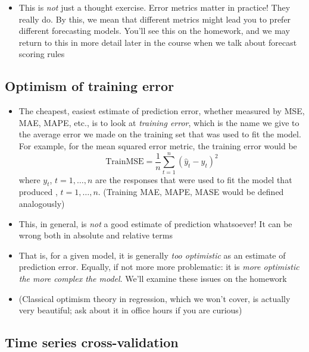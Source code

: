 \documentclass{article}
\begin{document}
\begin{itemize}
\item This is \emph{not} just a thought exercise. Error metrics matter in
  practice! They really do. By this, we mean that different metrics might lead
  you to prefer different forecasting models. You'll see this on the homework,
  and we may return to this in more detail later in the course when we talk
  about forecast scoring rules  
\end{itemize}

\subsection{Optimism of training error}

\def\TrainMSE{\mathrm{TrainMSE}}

\begin{itemize}
\item The cheapest, easiest estimate of prediction error, whether measured by
  MSE, MAE, MAPE, etc., is to look at \emph{training error}, which is the name
  we give to the average error we made on the training set that was used to fit
  the model. For example, for the mean squared error metric, the training error
  would be
  \[
  \TrainMSE = \frac{1}{n} \sum_{t=1}^n (\hat{y}_t - y_t)^2
  \]
  where $y_t$, $t = 1,\dots,n$ are the responses that were used to fit the model
  that produced , $t = 1,\dots,n$. (Training MAE, MAPE, MASE 
  would be defined analogously)

\item This, in general, is \emph{not} a good estimate of prediction
  whatsoever! It can be wrong both in absolute and relative terms

\item That is, for a given model, it is generally \emph{too optimistic} as an
  estimate of prediction error. Equally, if not more more problematic: it is
  \emph{more optimistic the more complex the model}. We'll examine these issues
  on the homework 

\item (Classical optimism theory in regression, which we won't cover, is
  actually very beautiful; ask about it in office hours if you are curious) 
\end{itemize}

\subsection{Time series cross-validation}

\def\SplitMSE{\mathrm{SplitMSE}} 
\def\CVMSE{\mathrm{CVMSE}}
\end{document}

